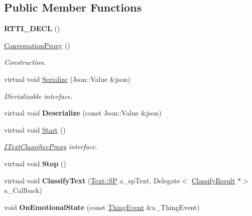 \subsection*{Public Member Functions}
\begin{DoxyCompactItemize}
\item 
\mbox{\label{class_conversation_proxy_a4162ffa048b1b4b9a86d8f1bac946c2b}} 
{\bfseries R\+T\+T\+I\+\_\+\+D\+E\+CL} ()
\item 
\mbox{\label{class_conversation_proxy_aad95391a2842d7862d12f1995f3cda29}} 
\hyperlink{class_conversation_proxy_aad95391a2842d7862d12f1995f3cda29}{Conversation\+Proxy} ()
\begin{DoxyCompactList}\small\item\em Construction. \end{DoxyCompactList}\item 
\mbox{\label{class_conversation_proxy_a2d2a6b1626561ace7f91530b7518b3e9}} 
virtual void \hyperlink{class_conversation_proxy_a2d2a6b1626561ace7f91530b7518b3e9}{Serialize} (Json\+::\+Value \&json)
\begin{DoxyCompactList}\small\item\em I\+Serializable interface. \end{DoxyCompactList}\item 
\mbox{\label{class_conversation_proxy_a8c91058aa38f62f411bfb2af5ab98871}} 
virtual void {\bfseries Deserialize} (const Json\+::\+Value \&json)
\item 
\mbox{\label{class_conversation_proxy_a482537f556269b33579dc33e22ce4bcd}} 
virtual void \hyperlink{class_conversation_proxy_a482537f556269b33579dc33e22ce4bcd}{Start} ()
\begin{DoxyCompactList}\small\item\em \hyperlink{class_i_text_classifier_proxy}{I\+Text\+Classifier\+Proxy} interface. \end{DoxyCompactList}\item 
\mbox{\label{class_conversation_proxy_a33841bc367dd5971c54440416470fcb2}} 
virtual void {\bfseries Stop} ()
\item 
\mbox{\label{class_conversation_proxy_a93d029052ebff80dbe2886cf457dc81a}} 
virtual void {\bfseries Classify\+Text} (\hyperlink{class_text_a35ce88bdca4f380b865b6066079230b1}{Text\+::\+SP} a\+\_\+sp\+Text, Delegate$<$ \hyperlink{struct_i_text_classifier_proxy_1_1_classify_result}{Classify\+Result} $\ast$$>$ a\+\_\+\+Callback)
\item 
\mbox{\label{class_conversation_proxy_a11f23d4459907f1cee9be15ca0e25558}} 
void {\bfseries On\+Emotional\+State} (const \hyperlink{class_thing_event}{Thing\+Event} \&a\+\_\+\+Thing\+Event)
\end{DoxyCompactItemize}
